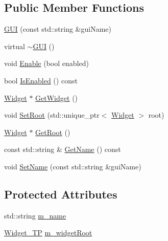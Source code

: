 \subsection*{Public Member Functions}
\begin{DoxyCompactItemize}
\item 
\mbox{\hyperlink{classngl__gui_1_1_g_u_i_a0b0002b02bdbf5fe660df18e104d96a8}{G\+UI}} (const std\+::string \&gui\+Name)
\item 
virtual \mbox{\hyperlink{classngl__gui_1_1_g_u_i_a1589c8616cbc59c64861bdbbcbb417b4}{$\sim$\+G\+UI}} ()
\item 
void \mbox{\hyperlink{classngl__gui_1_1_g_u_i_aa7dd88efa3541dd071aa80d7563bfc18}{Enable}} (bool enabled)
\item 
bool \mbox{\hyperlink{classngl__gui_1_1_g_u_i_ad9509cf34a9f5d0b9aaf71ca7604b9f3}{Is\+Enabled}} () const
\item 
\mbox{\hyperlink{classngl__gui_1_1_widget}{Widget}} $\ast$ \mbox{\hyperlink{classngl__gui_1_1_g_u_i_ace0c97783640c0de17dc162aa9386a29}{Get\+Widget}} ()
\item 
void \mbox{\hyperlink{classngl__gui_1_1_g_u_i_ae73ce5583001375639273e05b3c1d88e}{Set\+Root}} (std\+::unique\+\_\+ptr$<$ \mbox{\hyperlink{classngl__gui_1_1_widget}{Widget}} $>$ root)
\item 
\mbox{\hyperlink{classngl__gui_1_1_widget}{Widget}} $\ast$ \mbox{\hyperlink{classngl__gui_1_1_g_u_i_a52a2520dc946a7512ad4e57bafc6663f}{Get\+Root}} ()
\item 
const std\+::string \& \mbox{\hyperlink{classngl__gui_1_1_g_u_i_a5351aafd68b7b5feca4f723735b258d1}{Get\+Name}} () const
\item 
void \mbox{\hyperlink{classngl__gui_1_1_g_u_i_ac477048e34622fd98ff5c2b996f1519c}{Set\+Name}} (const std\+::string \&gui\+Name)
\end{DoxyCompactItemize}
\subsection*{Protected Attributes}
\begin{DoxyCompactItemize}
\item 
std\+::string \mbox{\hyperlink{classngl__gui_1_1_g_u_i_a45db809e6b975c853ee96916fda68758}{m\+\_\+name}}
\item 
\mbox{\hyperlink{classngl__gui_1_1_g_u_i_af4d527c3697ea8524c7af82bb855286d}{Widget\+\_\+\+TP}} \mbox{\hyperlink{classngl__gui_1_1_g_u_i_a8db080c30a3cbfc27879dacd7537b821}{m\+\_\+widget\+Root}}
\end{DoxyCompactItemize}


